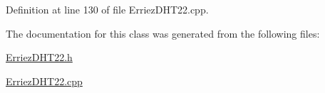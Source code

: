 Definition at line 130 of file Erriez\+D\+H\+T22.\+cpp.



The documentation for this class was generated from the following files\+:\begin{DoxyCompactItemize}
\item 
\hyperlink{_erriez_d_h_t22_8h}{Erriez\+D\+H\+T22.\+h}\item 
\hyperlink{_erriez_d_h_t22_8cpp}{Erriez\+D\+H\+T22.\+cpp}\end{DoxyCompactItemize}
